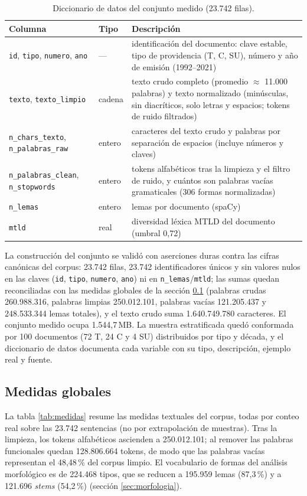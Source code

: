 \documentclass[11pt]{tg_usta}
\begin{document}
\begin{table}[htbp]
    \centering
    \caption{Diccionario de datos del conjunto medido (23.742 filas).}
    \label{tab:diccionario}
    \begin{tabular}{llp{}}
        \toprule
        \textbf{Columna} & \textbf{Tipo} & \textbf{Descripción} \\
        \midrule
        \texttt{id}, \texttt{tipo}, \texttt{numero}, \texttt{ano} & --- & identificación del documento: clave estable, tipo de providencia (T, C, SU), número y año de emisión (1992--2021) \\
        \texttt{texto}, \texttt{texto\_limpio} & cadena & texto crudo completo (promedio $\approx$ 11.000 palabras) y texto normalizado (minúsculas, sin diacríticos, solo letras y espacios; tokens de ruido filtrados) \\
        \texttt{n\_chars\_texto}, \texttt{n\_palabras\_raw} & entero & caracteres del texto crudo y palabras por separación de espacios (incluye números y claves) \\
        \texttt{n\_palabras\_clean}, \texttt{n\_stopwords} & entero & tokens alfabéticos tras la limpieza y el filtro de ruido, y cuántos son palabras vacías gramaticales (306 formas normalizadas) \\
        \texttt{n\_lemas} & entero & lemas por documento (spaCy) \\
        \texttt{mtld} & real & diversidad léxica MTLD del documento (umbral 0,72) \\
        \bottomrule
    \end{tabular}
\end{table}

La construcción del conjunto se validó con aserciones duras contra las cifras canónicas del corpus: 23.742 filas, 23.742 identificadores únicos y sin valores nulos en las claves (\texttt{id}, \texttt{tipo}, \texttt{numero}, \texttt{ano}) ni en \texttt{n\_lemas}/\texttt{mtld}; las sumas quedan reconciliadas con las medidas globales de la sección \ref{sec:medidas} (palabras crudas 260.988.316, palabras limpias 250.012.101, palabras vacías 121.205.437 y 248.533.344 lemas totales), y el texto crudo suma 1.640.749.780 caracteres. El conjunto medido ocupa 1.544,7\,MB. La muestra estratificada quedó conformada por 100 documentos (72 T, 24 C y 4 SU) distribuidos por tipo y década, y el diccionario de datos documenta cada variable con su tipo, descripción, ejemplo real y fuente.

\subsection{Medidas globales}
\label{sec:medidas}
La tabla \ref{tab:medidas} resume las medidas textuales del corpus, todas por conteo real sobre las 23.742 sentencias (no por extrapolación de muestras). Tras la limpieza, los tokens alfabéticos ascienden a 250.012.101; al remover las palabras funcionales quedan 128.806.664 tokens, de modo que las palabras vacías representan el 48,48\,\% del corpus limpio. El vocabulario de formas del análisis morfológico es de 224.468 tipos, que se reducen a 195.959 lemas (87,3\,\%) y a 121.696 \emph{stems} (54,2\,\%) (sección \ref{sec:morfologia}).
\end{document}
